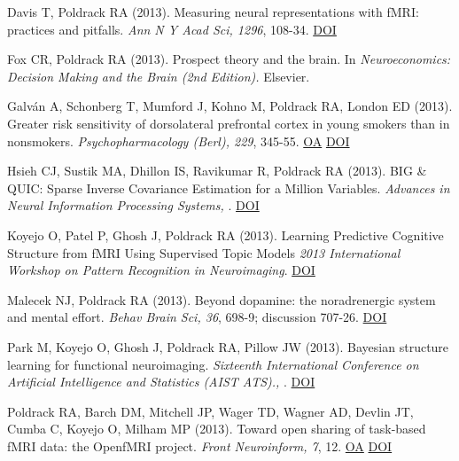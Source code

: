 \documentclass[10pt, letterpaper]{article}
\begin{document}
Davis T, Poldrack RA (2013). Measuring neural representations with fMRI: practices and pitfalls. \textit{Ann N Y Acad Sci, 1296}, 108-34. \href{http://dx.doi.org/10.1111/nyas.12156}{DOI} \vspace{2mm}

Fox CR, Poldrack RA (2013). Prospect theory and the brain. In \textit{Neuroeconomics: Decision Making and the Brain (2nd Edition).} Elsevier. \vspace{2mm}

Galván A, Schonberg T, Mumford J, Kohno M, Poldrack RA, London ED (2013). Greater risk sensitivity of dorsolateral prefrontal cortex in young smokers than in nonsmokers. \textit{Psychopharmacology (Berl), 229}, 345-55. \href{https://www.ncbi.nlm.nih.gov/pmc/articles/PMC3758460}{OA} \href{http://dx.doi.org/10.1007/s00213-013-3113-x}{DOI} \vspace{2mm}

Hsieh CJ, Sustik MA, Dhillon IS, Ravikumar R,  Poldrack RA (2013). BIG \& QUIC: Sparse Inverse Covariance Estimation for a Million Variables. \textit{Advances in Neural Information Processing Systems, }. \href{http://dx.doi.org/None}{DOI} \vspace{2mm}

Koyejo O, Patel P, Ghosh J, Poldrack RA (2013). Learning Predictive Cognitive Structure from fMRI Using Supervised Topic Models \textit{2013 International Workshop on Pattern Recognition in Neuroimaging}. \href{http://dx.doi.org/10.1109/prni.2013.12}{DOI} \vspace{2mm}

Malecek NJ, Poldrack RA (2013). Beyond dopamine: the noradrenergic system and mental effort. \textit{Behav Brain Sci, 36}, 698-9; discussion 707-26. \href{http://dx.doi.org/10.1017/s0140525x13001106}{DOI} \vspace{2mm}

Park M, Koyejo O, Ghosh J, Poldrack RA, Pillow JW (2013). Bayesian structure learning for functional neuroimaging. \textit{Sixteenth International Conference on Artificial Intelligence and Statistics (AIST ATS)., }. \href{http://dx.doi.org/None}{DOI} \vspace{2mm}

Poldrack RA, Barch DM, Mitchell JP, Wager TD, Wagner AD, Devlin JT, Cumba C, Koyejo O, Milham MP (2013). Toward open sharing of task-based fMRI data: the OpenfMRI project. \textit{Front Neuroinform, 7}, 12. \href{https://www.ncbi.nlm.nih.gov/pmc/articles/PMC3703526}{OA} \href{http://dx.doi.org/10.3389/fninf.2013.00012}{DOI} \vspace{2mm}
\end{document}
